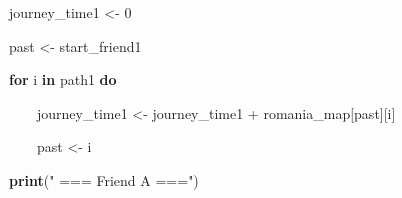 \documentclass[12pt]{article}
\begin{document}
\begin{adjustwidth}{0.5in}{0.0in}
\begin{justify}
{\fontsize{8pt}{9.6pt}\selectfont \ \ \  journey\_time1 <- 0\par}
\end{justify}\par

\end{adjustwidth}

\begin{adjustwidth}{0.5in}{0.0in}
\begin{justify}
{\fontsize{8pt}{9.6pt}\selectfont \ \ \  past <- start\_friend1\par}
\end{justify}\par

\end{adjustwidth}

\begin{adjustwidth}{0.5in}{0.0in}
\begin{justify}
{\fontsize{8pt}{9.6pt}\selectfont \ \ \  \textbf{for} i \textbf{in} path1\textbf{ do}\par}
\end{justify}\par

\end{adjustwidth}

\begin{adjustwidth}{0.5in}{0.0in}
\begin{justify}
{\fontsize{8pt}{9.6pt}\selectfont \ \ \ \ \ \ \  journey\_time1 <- journey\_time1 + romania\_map[past][i]\par}
\end{justify}\par

\end{adjustwidth}

\begin{adjustwidth}{0.5in}{0.0in}
\begin{justify}
{\fontsize{8pt}{9.6pt}\selectfont \ \ \ \ \ \ \  past <- i\par}
\end{justify}\par

\end{adjustwidth}

\begin{adjustwidth}{0.5in}{0.0in}
\begin{justify}
{\fontsize{8pt}{9.6pt}\selectfont \ \ \  \textbf{print}(" === Friend A ===")\par}
\end{justify}\par

\end{adjustwidth}
\end{document}
